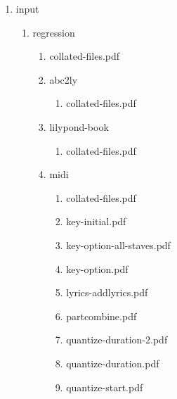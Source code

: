 \documentclass[11pt]{article}
\begin{document}
\begin{enumerate}
\begin{enumerate}
\begin{enumerate}
\begin{enumerate}
\begin{enumerate}
\begin{enumerate}
\begin{enumerate}
\item input
\label{sec-1-1-1-1-46-10-3-1-1-1-1-1-2}
\begin{enumerate}
\item regression
\label{sec-1-1-1-1-46-10-3-1-1-1-1-1-2-1}
\begin{enumerate}
\item collated-files.pdf
\label{sec-1-1-1-1-46-10-3-1-1-1-1-1-2-1-1}

\item abc2ly
\label{sec-1-1-1-1-46-10-3-1-1-1-1-1-2-1-2}
\begin{enumerate}
\item collated-files.pdf
\label{sec-1-1-1-1-46-10-3-1-1-1-1-1-2-1-2-1}
\end{enumerate}

\item lilypond-book
\label{sec-1-1-1-1-46-10-3-1-1-1-1-1-2-1-3}
\begin{enumerate}
\item collated-files.pdf
\label{sec-1-1-1-1-46-10-3-1-1-1-1-1-2-1-3-1}
\end{enumerate}

\item midi
\label{sec-1-1-1-1-46-10-3-1-1-1-1-1-2-1-4}
\begin{enumerate}
\item collated-files.pdf
\label{sec-1-1-1-1-46-10-3-1-1-1-1-1-2-1-4-1}

\item key-initial.pdf
\label{sec-1-1-1-1-46-10-3-1-1-1-1-1-2-1-4-2}

\item key-option-all-staves.pdf
\label{sec-1-1-1-1-46-10-3-1-1-1-1-1-2-1-4-3}

\item key-option.pdf
\label{sec-1-1-1-1-46-10-3-1-1-1-1-1-2-1-4-4}

\item lyrics-addlyrics.pdf
\label{sec-1-1-1-1-46-10-3-1-1-1-1-1-2-1-4-5}

\item partcombine.pdf
\label{sec-1-1-1-1-46-10-3-1-1-1-1-1-2-1-4-6}

\item quantize-duration-2.pdf
\label{sec-1-1-1-1-46-10-3-1-1-1-1-1-2-1-4-7}

\item quantize-duration.pdf
\label{sec-1-1-1-1-46-10-3-1-1-1-1-1-2-1-4-8}

\item quantize-start.pdf
\label{sec-1-1-1-1-46-10-3-1-1-1-1-1-2-1-4-9}


\end{enumerate}
\end{enumerate}
\end{enumerate}
\end{enumerate}
\end{enumerate}
\end{enumerate}
\end{enumerate}
\end{enumerate}
\end{enumerate}
\end{enumerate}
\end{document}
